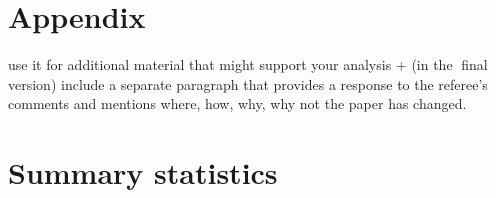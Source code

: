 \documentclass[11pt]{article}
\begin{document}
	
	
	\newpage
	
	\begin{subappendices}
		\appendix
		
		\section*{Appendix}\label{Appendix}
		\textit{}use it for additional material that might support your analysis + (in the final version) include a separate paragraph that provides a response to the referee's comments and mentions where, how, why, why not the paper has changed.
		\singlespacing
		\section{Summary statistics}\label{ASec:xxxxx}
		
	\end{subappendices}	
	
	
	
	\newpage
	{\footnotesize 
		
		\singlespacing
		
	}
	
	
\end{document}
